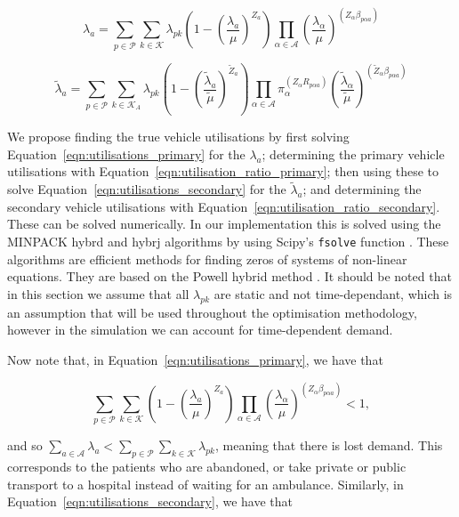 \documentclass[numbers,webpdf,imaman]{ima-authoring-template}%
\begin{document}
\begin{equation}\label{eqn:utilisations_primary}
\lambda_a = \sum_{p \in \mathcal{P}} \sum_{k \in \mathcal{K}} \lambda_{pk}
\left( 1 - \left(\frac{\lambda_a}{\mu}\right)^{Z_a} \right)
\prod_{\alpha \in \mathcal{A}} \left(\frac{\lambda_{\alpha}}{\mu}\right)^{
\left(Z_{\alpha} \beta_{p \alpha a}\right)}
\end{equation}

\begin{equation}\label{eqn:utilisations_secondary}
\tilde{\lambda}_a = \sum_{p \in \mathcal{P}}
\sum_{k \in \mathcal{K}_A} \lambda_{pk}
\left( 1 - \left(\frac{\tilde{\lambda}_a}{\tilde{\mu}}\right)^{\tilde{Z}_a} \right)
\prod_{\alpha \in \mathcal{A}} \pi_{\alpha}^{\left(Z_{\alpha} R_{p \alpha a}\right)}
\left(\frac{\tilde{\lambda}_{\alpha}}{\tilde{\mu}}\right)^{
\left(\tilde{Z}_{\alpha} \beta_{p \alpha a}\right)}
\end{equation}


We propose finding the true vehicle utilisations by first solving
Equation~\ref{eqn:utilisations_primary} for the $\lambda_a$; determining the
primary vehicle utilisations with Equation~\ref{eqn:utilisation_ratio_primary};
then using these to solve Equation~\ref{eqn:utilisations_secondary} for the
$\tilde{\lambda}_a$; and determining the secondary vehicle utilisations with
Equation~\ref{eqn:utilisation_ratio_secondary}. These can be solved
numerically. In our implementation this is solved using the MINPACK hybrd and
hybrj algorithms by using Scipy's \texttt{fsolve} function
\citep{2020SciPy-NMeth}. These algorithms are efficient methods for finding zeros of systems of non-linear equations. 
They are based on the Powell hybrid method \citep{powell70}. It should be noted that in this section we assume that
all $\lambda_{pk}$ are static and not time-dependant, which is an assumption
that will be used throughout the optimisation methodology, however in the
simulation we can account for time-dependent demand.

Now note that, in Equation~\ref{eqn:utilisations_primary}, we have that

$$\sum_{p \in \mathcal{P}} \sum_{k \in \mathcal{K}} \left( 1 - \left(\frac{\lambda_a}{\mu}\right)^{Z_a} \right) \prod_{\alpha \in \mathcal{A}} \left(\frac{\lambda_{\alpha}}{\mu}\right)^{\left(Z_{\alpha} \beta_{p \alpha a}\right)} < 1,$$

\noindent
and so
$\sum_{a \in \mathcal{A}} \lambda_a < \sum_{p \in \mathcal{P}} \sum_{k \in \mathcal{K}} \lambda_{pk}$,
meaning that there is lost demand. This corresponds to the patients who are
abandoned, or take private or public transport to a hospital instead of waiting
for an ambulance. Similarly, in Equation~\ref{eqn:utilisations_secondary}, we
have that
\end{document}
